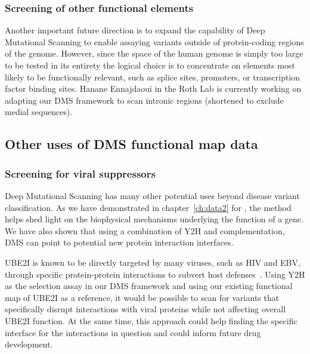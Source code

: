 \subsubsection{Screening of other functional elements}
Another important future direction is to expand the capability of Deep Mutational Scanning to enable assaying variants outside of protein-coding regions of the genome. However, since the space of the human genome is simply too large to be tested in its entirety the logical choice is to concentrate on elements most likely to be functionally relevant, such as splice sites, promoters, or transcription factor binding sites.
Hanane Ennajdaoui in the Roth Lab is currently working on adapting our DMS framework to scan intronic regions (shortened to exclude medial sequences).

\subsection{Other uses of DMS functional map data}

\subsubsection{Screening for viral suppressors}
Deep Mutational Scanning has many other potential uses beyond disease variant classification. As we have demonstrated in chapter~\ref{ch:data2} for , the method helps shed light on the biophysical mechanisms underlying the function of a gene. We have also shown that using a combination of Y2H and complementation, DMS can point to potential new protein interaction interfaces. 

UBE2I is known to be directly targeted by many viruses, such as HIV and EBV,  through specific protein-protein interactions to subvert host defenses~\cite{varadaraj_sumo_2014}. Using Y2H as the selection assay in our DMS framework and using our existing functional map of UBE2I as a reference, it would be possible to scan for variants that specifically disrupt interactions with viral proteins while not affecting overall UBE2I function. At the same time, this approach could help finding the specific interface for the interactions in question and could inform future drug development.

